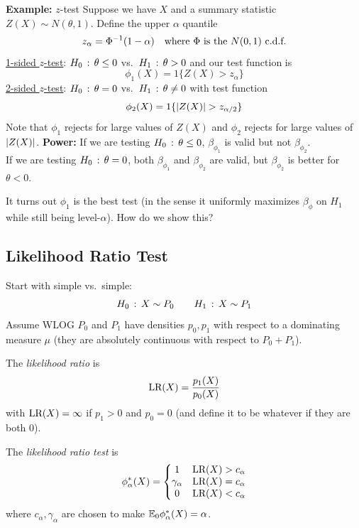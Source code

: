 
\begin{example}{\textbf{Example:} $z$-test}
    Suppose we have $X$ and a summary statistic $Z(X) \sim N(\theta, 1)$. Define the upper $\alpha$ quantile
    \[ z_{\alpha} = \Phi^{-1}(1 - \alpha) \quad \tt{where } \Phi \tt{ is the } N(0, 1) \tt{ c.d.f.} \]
    \underline{1-sided $z$-test}: $H_0 \col \theta \leq 0$ vs.\ $H_1 \col \theta > 0$ and our test function is
    \[ \phi_1(X) = 1\{Z(X) > z_{\alpha}\} \]
    \underline{2-sided $z$-test}: $H_0 \col \theta = 0$ vs.\ $H_1 \col \theta \neq 0$ with test function
    \[ \phi_2(X) = 1\{\abs{Z(X)} > z_{\alpha/2}\} \]
    Note that $\phi_1$ rejects for large values of $Z(X)$ and $\phi_2$ rejects for large values of $\abs{Z(X)}$.
    \textbf{Power:}
    If we are testing $H_0 \col \theta \leq 0$, $\beta_{\phi_1}$ is valid but not $\beta_{\phi_2}$.\\

    If we are testing $H_0 \col \theta = 0$, both $\beta_{\phi_1}$ and $\beta_{\phi_2}$ are valid, but $\beta_{\phi_2}$ is better for $\theta < 0$.
\end{example}

It turns out $\phi_1$ is the best test (in the sense it uniformly maximizes $\beta_{\phi}$ on $H_1$ while still being level-$\alpha$). How do we show this?

\subsection*{Likelihood Ratio Test}
\sectionspace

Start with simple vs.\ simple:
\[ H_0 \col X \sim P_0 \qquad H_1 \col X \sim P_1 \]
Assume WLOG $P_0$ and $P_1$ have densities $p_0, p_1$ with respect to a dominating measure $\mu$ (they are absolutely continuous with respect to $P_0 + P_1$).

\begin{definition}
    The \emph{likelihood ratio} is
    \[ \tt{LR}(X) = \frac{p_1(X)}{p_0(X)} \]
    with $\tt{LR}(X) = \infty$ if $p_1 > 0$ and $p_0 = 0$ (and define it to be whatever if they are both $0$).
\end{definition}

\begin{definition}
    The \emph{likelihood ratio test} is
    \[ \phi_{\alpha}^{*}(X) = \left\{\begin{matrix} 1 & \tt{LR}(X) > c_{\alpha} \\ \gamma_{\alpha} & \tt{LR}(X) = c_{\alpha} \\ 0 & \tt{LR}(X) < c_{\alpha} \end{matrix}\right. \]
    where $c_{\alpha}, \gamma_{\alpha}$ are chosen to make $\E_0\phi_{\alpha}^{*}(X) = \alpha$.
\end{definition}

